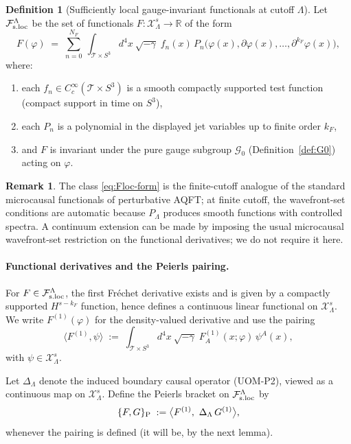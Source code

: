 \documentclass[10pt]{article}
\theoremstyle{definition}
\newtheorem{definition}{Definition}[section]
\newtheorem{remark}{Remark}[section]
\theoremstyle{plain}
\begin{document}
\begin{definition}[Sufficiently local gauge-invariant functionals at cutoff $\Lambda$]
\label{def:Floc}
Let $\mathcal F_{\rm s.loc}^\Lambda$ be the set of functionals $F:\mathcal X_\Lambda^s\to\mathbb R$ of the form
\begin{equation}
F(\varphi)\;=\;\sum_{n=0}^{N_F}\ \int_{\mathscr T\times S^3}\! d^4x\ \sqrt{-\gamma}\;
f_n(x)\,P_n\big(\varphi(x),\partial\varphi(x),\ldots,\partial^{k_F}\varphi(x)\big),
\label{eq:Floc-form}
\end{equation}
where:
\begin{enumerate}[label=(\roman*),leftmargin=2.0em,itemsep=1pt]
\item each $f_n\in C_c^\infty(\mathscr T\times S^3)$ is a smooth compactly supported test function (compact support in time on $S^3$),
\item each $P_n$ is a polynomial in the displayed jet variables up to finite order $k_F$,
\item and $F$ is invariant under the pure gauge subgroup $\mathcal G_0$ (Definition~\ref{def:G0}) acting on $\varphi$.
\end{enumerate}
\end{definition}

\begin{remark}
The class \eqref{eq:Floc-form} is the finite-cutoff analogue of the standard microcausal functionals of perturbative AQFT; at finite cutoff,
the wavefront-set conditions are automatic because $P_\Lambda$ produces smooth functions with controlled spectra.  A continuum extension can be
made by imposing the usual microcausal wavefront-set restriction on the functional derivatives; we do not require it here.
\end{remark}

\paragraph{Functional derivatives and the Peierls pairing.}
For $F\in\mathcal F_{\rm s.loc}^\Lambda$, the first Fr\'echet derivative exists and is given by a compactly supported $H^{s-k_F}$ function,
hence defines a continuous linear functional on $\mathcal X_\Lambda^s$.  We write $F^{(1)}(\varphi)$ for the density-valued derivative and use
the pairing
\[
\langle F^{(1)},\psi\rangle \;:=\;\int_{\mathscr T\times S^3}\! d^4x\ \sqrt{-\gamma}\; F^{(1)}_A(x;\varphi)\,\psi^A(x),
\]
with $\psi\in\mathcal X_\Lambda^s$.

Let $\Delta_\Lambda$ denote the induced boundary causal operator (UOM-P2), viewed as a continuous map on $\mathcal X_\Lambda^s$.
Define the Peierls bracket on $\mathcal F_{\rm s.loc}^\Lambda$ by
\begin{equation}
\{F,G\}_{\rm P}
\;:=
\big\langle F^{(1)},\ \Delta_\Lambda\,G^{(1)}\big\rangle,
\label{eq:Peierls-FG}
\end{equation}
whenever the pairing is defined (it will be, by the next lemma).
\end{document}
